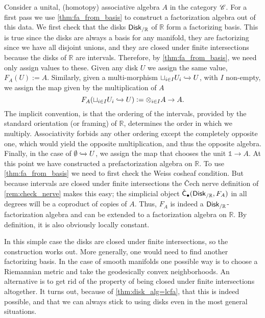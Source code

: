 \documentclass[../text]{subfiles}
\begin{document}
\begin{construction}\label{con:lcfas_on_R}
    Consider a unital, (homotopy) associative algebra $A$ in the category $\mathscr{C}$. For a first pass we use \cref{thm:fa_from_basis} to construct a factorization algebra out of this data. We first check that the disks $\disk[r]_{/\mathbb{R}}$ of $\mathbb{R}$ form a factorizing basis. This is true since the disks are always a basis for any manifold, they are factorizing since we have all disjoint unions, and they are closed under finite intersections because the disks of $\mathbb{R}$ are intervals. Therefore, by \cref{thm:fa_from_basis}, we need only assign values to these. Given any disk $U$ we assign the same value, $F_A(U) := A$. Similarly, given a multi-morphism $\sqcup_{i \in I} U_i \xhookrightarrow{} U$, with $I$ non-empty, we assign the map given by the multiplication of $A$
    \begin{equation}
        F_A(\sqcup_{i \in I} U_i \xhookrightarrow{} U) := \otimes_{i \in I} A \rightarrow A.
    \end{equation}
    The implicit convention, is that the ordering of the intervals, provided by the standard orientation (or framing) of $\mathbb{R}$, determines the order in which we multiply. Associativity forbids any other ordering except the completely opposite one, which would yield the opposite multiplication, and thus the opposite algebra. Finally, in the case of $\emptyset \xhookrightarrow{} U$, we assign the map that chooses the unit $\mathbb{1} \rightarrow A$. At this point we have constructed a prefactorization algebra on $\mathbb{R}$. To use \cref{thm:fa_from_basis} we need to first check the Weiss cosheaf condition. But because intervals are closed under finite intersections the \v{C}ech nerve definition of \cref{rem:check_nerve} makes this easy; the simplicial object $\cech_{\bullet}(\disk[r]_{/\mathbb{R}}, F_A)$ in all degrees will be a coproduct of copies of $A$. Thus, $F_A$ is indeed a $\disk[r]_{/\mathbb{R}}$-factorization algebra and can be extended to a factorization algebra on $\mathbb{R}$. By definition, it is also obviously locally constant.

    In this simple case the disks are closed under finite intersections, so the construction works out. More generally, one would need to find another factorizing basis. In the case of smooth manifolds one possible way is to choose a Riemannian metric and take the geodesically convex neighborhoods. An alternative is to get rid of the property of being closed under finite intersections altogether. It turns out, because of \cref{thm:disk_alg=lcfa}, that this is indeed possible, and that we can always stick to using disks even in the most general situations.


\end{construction}
\end{document}
